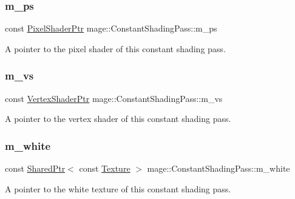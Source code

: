 \subsubsection{\texorpdfstring{m\+\_\+ps}{m\_ps}}
{\footnotesize\ttfamily const \hyperlink{namespacemage_acbec875bb5e5e085e32ed244a24d2b6f}{Pixel\+Shader\+Ptr} mage\+::\+Constant\+Shading\+Pass\+::m\+\_\+ps\hspace{0.3cm}{\ttfamily [private]}}

A pointer to the pixel shader of this constant shading pass. \hypertarget{classmage_1_1_constant_shading_pass_ac714700a87f0eb41b2316c8d3e664811}{}\label{classmage_1_1_constant_shading_pass_ac714700a87f0eb41b2316c8d3e664811} 
\subsubsection{\texorpdfstring{m\+\_\+vs}{m\_vs}}
{\footnotesize\ttfamily const \hyperlink{namespacemage_a1f19b094f771e30bc0a6c1cebcc0dd58}{Vertex\+Shader\+Ptr} mage\+::\+Constant\+Shading\+Pass\+::m\+\_\+vs\hspace{0.3cm}{\ttfamily [private]}}

A pointer to the vertex shader of this constant shading pass. \hypertarget{classmage_1_1_constant_shading_pass_aa5c9222b0de16e351b90752150d584d1}{}\label{classmage_1_1_constant_shading_pass_aa5c9222b0de16e351b90752150d584d1} 
\subsubsection{\texorpdfstring{m\+\_\+white}{m\_white}}
{\footnotesize\ttfamily const \hyperlink{namespacemage_a1e01ae66713838a7a67d30e44c67703e}{Shared\+Ptr}$<$ const \hyperlink{classmage_1_1_texture}{Texture} $>$ mage\+::\+Constant\+Shading\+Pass\+::m\+\_\+white\hspace{0.3cm}{\ttfamily [private]}}

A pointer to the white texture of this constant shading pass. 